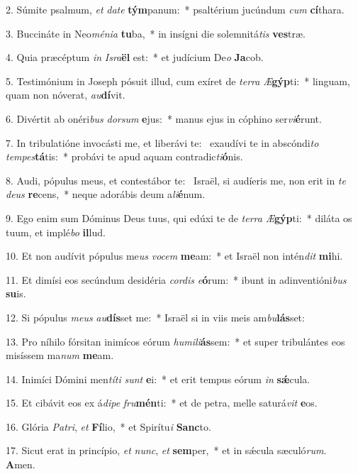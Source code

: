 2. Súmite psalmum, \textit{et} \textit{da}\textit{te} \textbf{tým}panum:~*  psaltérium jucúndum \textit{cum} \textbf{cí}thara.\

3. Buccináte in Neo\textit{mé}\textit{ni}\textit{a} \textbf{tu}ba,~*  in insígni die solemnitá\textit{tis} \textbf{ves}træ.\

4. Quia præcéptum \textit{in} \textit{Is}\textit{ra}\textbf{ël} est:~*  et judícium De\textit{o} \textbf{Ja}cob.\

5. Testimónium in Joseph pósuit illud, cum exíret de \textit{ter}\textit{ra} \textit{Æ}\textbf{gýp}ti:~*  linguam, quam non nóverat, \textit{au}\textbf{dí}vit.\

6. Divértit ab onéri\textit{bus} \textit{dor}\textit{sum} \textbf{e}jus:~*  manus ejus in cóphino ser\textit{vi}\textbf{é}runt.\

7. In tribulatióne invocásti me, et liberávi te: \dag\  exaudívi te in abscóndi\textit{to} \textit{tem}\textit{pes}\textbf{tá}tis:~*  probávi te apud aquam contradic\textit{ti}\textbf{ó}nis.\

8. Audi, pópulus meus, et contestábor te: \dag\  Israël, si audíeris me, non erit in \textit{te} \textit{de}\textit{us} \textbf{re}cens,~*  neque adorábis deum a\textit{li}\textbf{é}num.\

9. Ego enim sum Dóminus Deus tuus, qui edúxi te de \textit{ter}\textit{ra} \textit{Æ}\textbf{gýp}ti:~*  diláta os tuum, et implé\textit{bo} \textbf{il}lud.\

10. Et non audívit pópulus me\textit{us} \textit{vo}\textit{cem} \textbf{me}am:~*  et Israël non intén\textit{dit} \textbf{mi}hi.\

11. Et dimísi eos secúndum desidéria \textit{cor}\textit{dis} \textit{e}\textbf{ó}rum:~*  ibunt in adinventióni\textit{bus} \textbf{su}is.\

12. Si pópulus \textit{me}\textit{us} \textit{au}\textbf{dís}set me:~*  Israël si in viis meis am\textit{bu}\textbf{lás}set:\

13. Pro níhilo fórsitan inimícos eórum \textit{hu}\textit{mi}\textit{li}\textbf{ás}sem:~*  et super tribulántes eos misíssem ma\textit{num} \textbf{me}am.\

14. Inimíci Dómini men\textit{tí}\textit{ti} \textit{sunt} \textbf{e}i:~*  et erit tempus eórum \textit{in} \textbf{sǽ}cula.\

15. Et cibávit eos ex á\textit{di}\textit{pe} \textit{fru}\textbf{mén}ti:~*  et de petra, melle saturá\textit{vit} \textbf{e}os.\

16. Glória \textit{Pa}\textit{tri}, \textit{et} \textbf{Fí}lio,~*  et Spirítu\textit{i} \textbf{Sanc}to.\

17. Sicut erat in princípio, \textit{et} \textit{nunc}, \textit{et} \textbf{sem}per,~*  et in sǽcula sæculó\textit{rum}. \textbf{A}men.\

